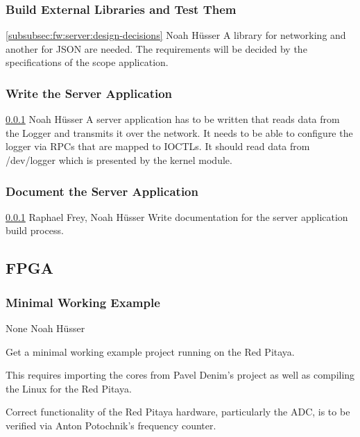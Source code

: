 \documentclass[a4paper,oneside]{alpenspecs/alpenspecs}
\begin{document}
\subsubsection{Build External Libraries and Test Them}
\label{subsubsec:fw:server:external}
\wpac
    {}
    {}
    {}
    {\ref{subsubsec:fw:server:design-decisions}}
    {}
    {Noah H\"usser}
    {%
        A library for networking and another for JSON are needed. The requirements will be decided by the specifications of the scope application.
    }

\subsubsection{Write the Server Application}
\label{subsubsec:fw:server:server}
\wpac
    {}
    {}
    {}
    {\ref{subsubsec:fw:server:external}}
    {}
    {Noah H\"usser}
    {%
        A server application has to be written that reads data from the Logger and transmits it over the network.
        It needs to be able to configure the logger via RPCs that are mapped to IOCTLs.
        It should read data from /dev/logger which is presented by the kernel module.
    }

\subsubsection{Document the Server Application}
\label{subsubsec:fw:server:docs}
\wpac
    {}
    {}
    {}
    {\ref{subsubsec:fw:server:external}}
    {}
    {Raphael Frey, Noah H\"usser}
    {%
        Write documentation for the server application build process.
    }

\subsection{FPGA}
\label{subsec:fw:fpga}

\subsubsection{Minimal Working Example}
\label{subsubsec:fw:fpga:mwe}
\wpac
    {}
    {}
    {}
    {None}
    {}
    {Noah H\"usser}
    {%
        Get a minimal working example project running on the Red Pitaya.

        This requires importing the cores from Pavel Denim's project as
        well as compiling the Linux for the Red Pitaya.

        Correct functionality of the Red Pitaya hardware, particularly the
        ADC, is to be verified via Anton Potochnik's frequency counter.
    }
\end{document}
